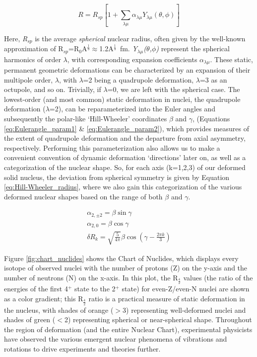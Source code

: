 \begin{equation}\label{eq:def_radius}
R=R_{sp} [1+\sum_{\lambda\mu} \alpha_{\lambda\mu} Y_{\lambda\mu}(\theta,\phi)]
\end{equation}

Here, \textit{R$_{sp}$} is the average \textit{spherical} nuclear radius, often given by the well-known approximation of R$_{sp}$=R$_0$A$^{\frac{1}{3}}\approx$1.2A$^{\frac{1}{3}}$~fm. \textit{Y$_{\lambda\mu}$($\theta$,$\phi$)} represent the spherical harmonics of order $\lambda$, with corresponding expansion coefficients \textit{$\alpha_{\lambda\mu}$}. These static, permanent geometric deformations can be characterized by an expansion of their multipole order, \textit{$\lambda$}, with $\lambda$=2 being a quadrupole deformation, $\lambda$=3 as an octupole, and so on. Trivially, if $\lambda$=0, we are left with the spherical case. The lowest-order (and most common) static deformation in nuclei, the quadrupole deformation ($\lambda$=2), can be reparameterized into the Euler angles and subsequently the polar-like `Hill-Wheeler' coordinates \textit{$\beta$} and \textit{$\gamma$}, (Equations \ref{eq:Eulerangle_param1} \& \ref{eq:Eulerangle_param2}), which provides measures of the extent of quadrupole deformation and the departure from axial asymmetry, respectively. Performing this parameterization also allows us to make a convenient convention of dynamic deformation `directions' later on, as well as a categorization of the nuclear shape. So, for each axis (k=1,2,3) of our deformed solid nucleus, the deviation from spherical symmetry is given by Equation \ref{eq:Hill-Wheeler_radius}, where we also gain this categorization of the various deformed nuclear shapes based on the range of both \textit{$\beta$} and \textit{$\gamma$}. 

\begin{align}
\alpha_{2,\pm2}=\beta\sin\gamma \label{eq:Eulerangle_param1}\\
\alpha_{2,0}=\beta\cos\gamma \label{eq:Eulerangle_param2}\\
\delta R_k=\sqrt{\frac{5}{4\pi}}\beta\cos(\gamma-\frac{2\pi k}{3}) \label{eq:Hill-Wheeler_radius}
\end{align}

Figure \ref{fig:chart_nuclides} shows the Chart of Nuclides, which displays every isotope of observed nuclei with the number of protons (Z) on the y-axis and the number of neutrons (N) on the x-axis. In this plot, the R$_{\frac{4}{2}}$ values (the ratio of the energies of the first 4$^+$ state to the 2$^+$ state) for even-Z/even-N nuclei are shown as a color gradient; this R$_{\frac{4}{2}}$ ratio is a practical measure of static deformation in the nucleus, with shades of orange ($>$3) representing well-deformed nuclei and shades of green ($<$2) representing spherical or near-spherical shape. Throughout the region of deformation (and the entire Nuclear Chart), experimental physicists have observed the various emergent nuclear phenomena of vibrations and rotations to drive experiments and theories further.

